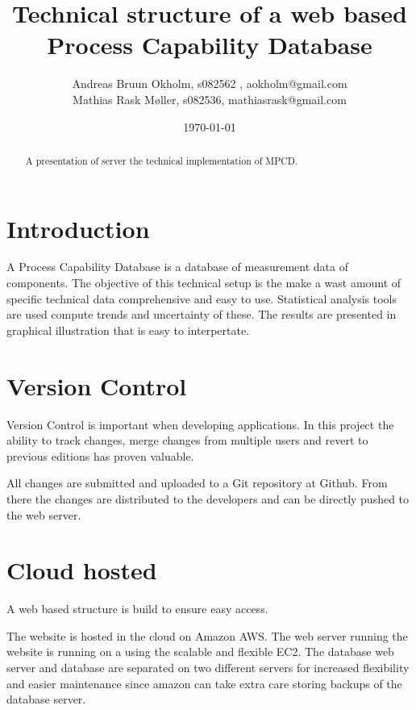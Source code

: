 \documentclass[aip,amsmath,reprint, author-year]{revtex4-1}
\begin{document}
\begin{abstract}
A presentation of server the technical implementation of MPCD.
\end{abstract}

\title{Technical structure of a web based Process Capability Database }
\author{Andreas Bruun Okholm, s082562 , aokholm@gmail.com\\
Mathias Rask Møller, s082536, mathiasrask@gmail.com }
 
\date{\today}
\maketitle


\section{Introduction}
A Process Capability Database is a database of measurement data of components. The objective of this technical setup is the make a wast amount of specific technical data comprehensive and easy to use. Statistical analysis tools are used compute trends and uncertainty of these. The results are presented in graphical illustration that is easy to interpertate.

\section{Version Control}
Version Control is important when developing applications. In this project the ability to track changes, merge changes from multiple users and revert to previous editions has proven valuable.

All changes are submitted and uploaded to a Git repository at Github. From there the changes are distributed to the developers and can be directly pushed to the web server. 

\section{Cloud hosted}
A web based structure is build to ensure easy access. 

The website is hosted in the cloud on Amazon AWS. The web server running the website is running on a using the scalable and flexible EC2. The database web server and database are separated on two different servers for increased flexibility and easier maintenance since amazon can take extra care storing backups of the database server. 
\end{document}
